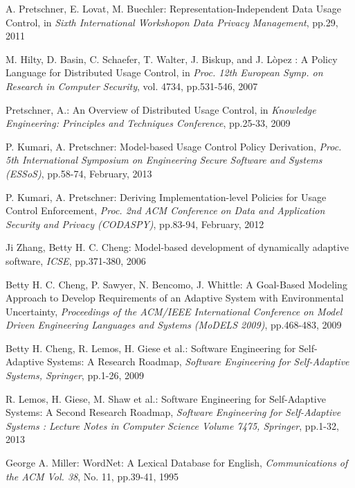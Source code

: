 \documentclass{sig-alternate}
\begin{document}
\begin{thebibliography}{4}

 A. Pretschner, E. Lovat, M. Buechler: Representation-Independent Data Usage Control, in
\textit{Sixth International Workshopon Data Privacy Management}, pp.29, 2011

 M. Hilty, D. Basin, C. Schaefer, T. Walter, J. Biskup, and J. L\`{o}pez : A Policy Language for Distributed Usage Control, in
\textit{Proc. 12th European  Symp. on Research in Computer Security}, vol. 4734, pp.531-546, 2007

 Pretschner, A.: An Overview of Distributed Usage Control, in
\textit{Knowledge Engineering: Principles and Techniques Conference}, pp.25-33, 2009

 P. Kumari, A. Pretschner: Model-based Usage Control Policy Derivation, 
\textit{Proc. 5th International Symposium on Engineering Secure Software and Systems (ESSoS)}, pp.58-74, February, 2013

 P. Kumari, A. Pretschner: Deriving Implementation-level Policies for Usage Control Enforcement, 
\textit{Proc. 2nd ACM Conference on Data and Application Security and Privacy (CODASPY)}, pp.83-94, February, 2012

 Ji Zhang, Betty H. C. Cheng: Model-based development of dynamically adaptive software, 
\textit{ICSE}, pp.371-380, 2006

 Betty H. C. Cheng, P. Sawyer, N. Bencomo, J. Whittle: A Goal-Based Modeling Approach to Develop Requirements of an Adaptive System with Environmental Uncertainty, 
\textit{Proceedings of the ACM/IEEE International Conference on Model Driven Engineering Languages and Systems (MoDELS 2009)}, pp.468-483, 2009

 Betty H. Cheng, R. Lemos, H. Giese et al.: Software Engineering for Self-Adaptive Systems: A Research Roadmap, 
\textit{Software Engineering for Self-Adaptive Systems, Springer}, pp.1-26, 2009

 R. Lemos, H. Giese, M. Shaw et al.: Software Engineering for Self-Adaptive Systems: A Second Research Roadmap, 
\textit{Software Engineering for Self-Adaptive Systems : Lecture Notes in Computer Science Volume 7475, Springer}, pp.1-32, 2013

 George A. Miller: WordNet: A Lexical Database for English, 
\textit{Communications of the ACM Vol. 38}, No. 11, pp.39-41, 1995


\end{thebibliography}
\end{document}
